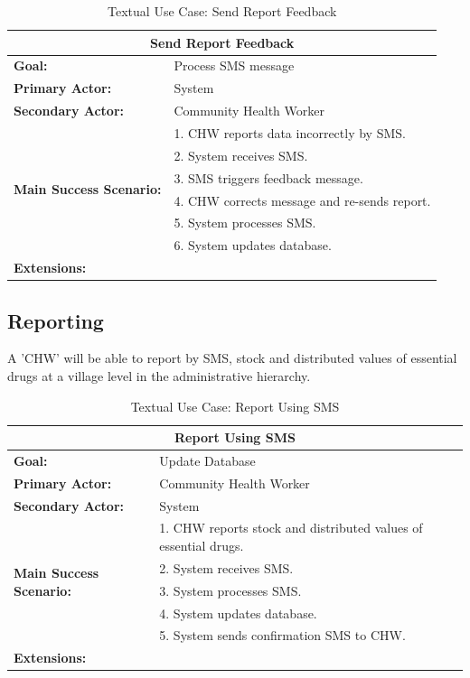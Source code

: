 \documentclass[a4paper]{report}
\begin{document}
\begin{table}[h]
	\centering
	\begin{tabular}{|l|l|}
		\hline
		\multicolumn{2}{|c|}{\textbf{Send Report Feedback}} \\
		\hline
		\textbf{Goal:} & Process SMS message\\
		\hline
		\textbf{Primary Actor:} & System \\
		\hline
		\textbf{Secondary Actor:} & Community Health Worker \\
		\hline
		\multirow{6}{*}{\textbf{Main Success Scenario:}}	& 1. CHW reports data incorrectly by SMS. \\
																											& 2. System receives SMS. \\
																											& 3. SMS triggers feedback message. \\
																											& 4. CHW corrects message and re-sends report. \\
																											& 5. System processes SMS. \\
																											& 6. System updates database. \\
		\hline
		\textbf{Extensions:} & \\
		\hline
	\end{tabular}
	\caption{Textual Use Case: Send Report Feedback}
\end{table}
\pagebreak

\subsection{Reporting}

A 'CHW' will be able to report by SMS, stock and distributed values of essential drugs at a village level in the administrative hierarchy. 

\begin{table}[h]
	\centering
	\begin{tabular}{|l|l|}
		\hline
		\multicolumn{2}{|c|}{\textbf{Report Using SMS}}\\
		\hline
		\textbf{Goal:} & Update Database \\
		\hline
		\textbf{Primary Actor:} & Community Health Worker\\
		\hline
		\textbf{Secondary Actor:} & System \\
		\hline
		\multirow{5}{*}{\textbf{Main Success Scenario:}}	& 1. CHW reports stock and distributed values of essential drugs. \\
																											& 2. System receives SMS. \\
																											& 3. System processes SMS. \\
																											& 4. System updates database. \\
																											& 5. System sends confirmation SMS to CHW. \\
		\hline
		\textbf{Extensions:} & \\
		\hline
	\end{tabular}
	\caption{Textual Use Case: Report Using SMS}
\end{table}
\pagebreak
\end{document}
